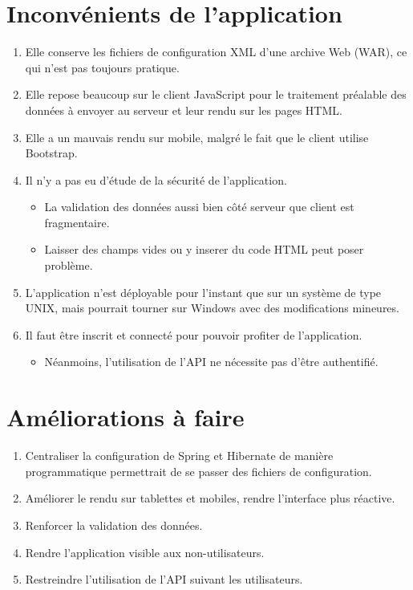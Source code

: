 \documentclass[11pt,a4paper,margin=0.5in]{report}
\begin{document}
\section{Inconvénients de l'application}
\begin{enumerate}
    \item Elle conserve les fichiers de configuration XML d'une archive Web (WAR), ce qui n'est pas toujours pratique.
    \item Elle repose beaucoup sur le client JavaScript pour le traitement préalable des données à envoyer au serveur et leur rendu sur les pages HTML.
    \item Elle a un mauvais rendu sur mobile, malgré le fait que le client utilise Bootstrap.
    \item Il n'y a pas eu d'étude de la sécurité de l'application.
        \begin{itemize}
            \item La validation des données aussi bien côté serveur que client est fragmentaire. 
            \item Laisser des champs vides ou y inserer du code HTML peut poser problème.
        \end{itemize}
    \item L'application n'est déployable pour l'instant que sur un système de type UNIX, mais pourrait tourner sur Windows avec des modifications mineures.
    \item Il faut être inscrit et connecté pour pouvoir profiter de l'application.
        \begin{itemize}
            \item Néanmoins, l'utilisation de l'API ne nécessite pas d'être authentifié. 
        \end{itemize}
\end{enumerate}

\section{Améliorations à faire}
\begin{enumerate}
    \item Centraliser la configuration de Spring et Hibernate de manière programmatique permettrait de se passer des fichiers de configuration.
    \item Améliorer le rendu sur tablettes et mobiles, rendre l'interface plus réactive.
    \item Renforcer la validation des données.
    \item Rendre l'application visible aux non-utilisateurs.
    \item Restreindre l'utilisation de l'API suivant les utilisateurs.
\end{enumerate}
\end{document}
